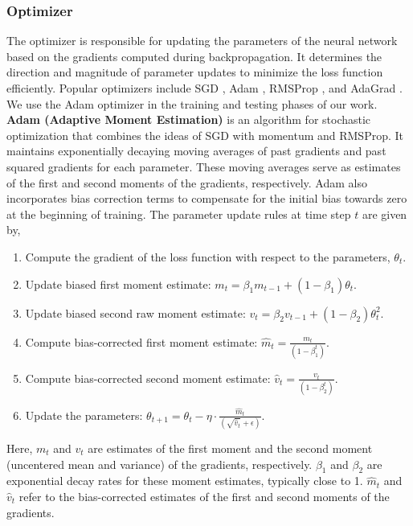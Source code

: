 \subsubsection{Optimizer} 
The optimizer is responsible for updating the parameters of the neural network based on the gradients computed during backpropagation. It determines the direction and magnitude of parameter updates to minimize the loss function efficiently. Popular optimizers include \gls{SGD} \cite{sgd}, \gls{Adam} \cite{adam}, \gls{RMSProp} \cite{rmsprop}, and \gls{AdaGrad} \cite{adagrad}. We use the Adam optimizer in the training and testing phases of our work. \\
 \textbf{Adam (Adaptive Moment Estimation)} is an algorithm for stochastic optimization that combines the ideas of SGD with momentum and RMSProp. It maintains exponentially decaying moving averages of past gradients and past squared gradients for each parameter. These moving averages serve as estimates of the first and second moments of the gradients, respectively. Adam also incorporates bias correction terms to compensate for the initial bias towards zero at the beginning of training. The parameter update rules at time step $t$ are given by,
 \begin{enumerate}
  \item Compute the gradient of the loss function with respect to the parameters, \(\theta_t\).
  \item Update biased first moment estimate: \(m_t = \beta_1 m_{t-1} + (1 - \beta_1)\theta_t\).
  \item Update biased second raw moment estimate: \(v_t = \beta_2 v_{t-1} + (1 - \beta_2)\theta_t^2\).
  \item Compute bias-corrected first moment estimate: \(\hat{m}_t = \frac{m_t}{(1 - \beta_1^t)}\).
  \item Compute bias-corrected second moment estimate: \(\hat{v}_t = \frac{v_t}{(1 - \beta_2^t)}\).
  \item Update the parameters: \(\theta_{t+1} = \theta_t - \eta \cdot \frac{\hat{m}_t}{(\sqrt{\hat{v}_t} + \epsilon)}\).
\end{enumerate}
Here, \(m_t\) and \(v_t\) are estimates of the first moment and the second moment (uncentered mean and variance) of the gradients, respectively. \(\beta_1\) and \(\beta_2\) are exponential decay rates for these moment estimates, typically close to 1. $\hat{m}_t$ and $\hat{v}_t$ refer to the bias-corrected estimates of the first and second moments of the gradients.
